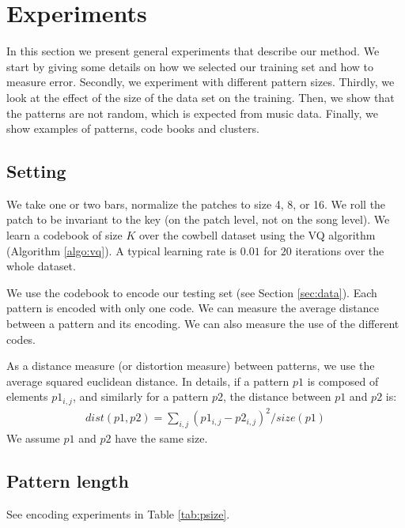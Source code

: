 \documentclass{article}
\begin{document}
\section{Experiments}\label{sec:experiments}
In this section we present general experiments that describe our method.
We start by giving some details on how we selected our training set and
how to measure error. Secondly, we experiment with different pattern sizes.
Thirdly, we look at the effect of the size of the
data set on the training. Then, we show that the patterns are not random,
which is expected from music data. Finally, we show examples of patterns,
code books and clusters.


\subsection{Setting}\label{ssec:setting}
We take one or two bars, normalize the patches to size 4, 8, or 16.
We roll the patch to be invariant to the key (on the patch level, not on
the song level). We learn a codebook of size $K$ over the cowbell dataset 
using the VQ algorithm (Algorithm \ref{algo:vq}). A typical learning rate 
is $0.01$ for $20$ iterations over the whole dataset.

We use the codebook to encode our testing set (see Section \ref{sec:data}).
Each pattern is encoded with only one code. We can measure the average
distance between a pattern and its encoding. We can also measure the use
of the different codes.

As a distance measure (or distortion measure) between patterns, we use
the average squared euclidean distance. In details, if a pattern $p1$
is composed of elements $p1_{i,j}$, and similarly for a pattern $p2$,
the distance between $p1$ and $p2$ is:
\begin{eqnarray}
  dist(p1,p2) = \sum_{i,j} (p1_{i,j} - p2_{i,j})^2 / size(p1)  \label{eq:dist}
\end{eqnarray}
We assume $p1$ and $p2$ have the same size.

\subsection{Pattern length}
See encoding experiments in Table \ref{tab:psize}.
\end{document}
